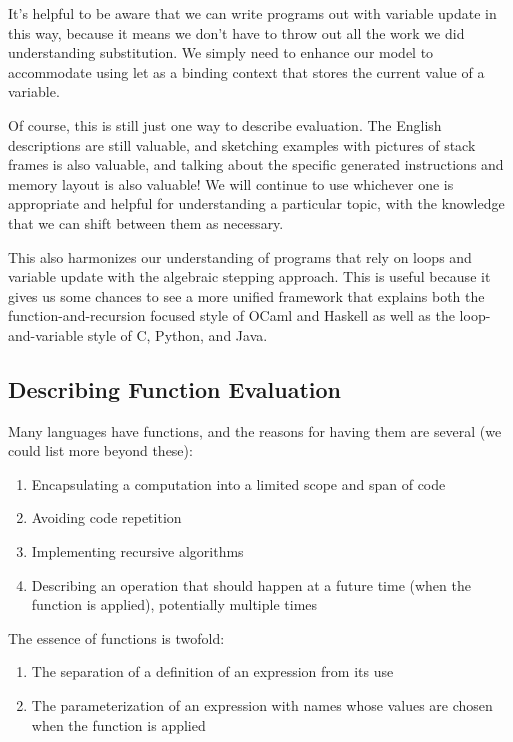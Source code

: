 \documentclass[10pt, oneside]{article}
\begin{document}
It's helpful to be aware that we can write programs out with variable update
in this way, because it means we don't have to throw out all the work we did
understanding substitution. We simply need to enhance our model to
accommodate using let as a binding context that stores the current value of a
variable.

Of course, this is still just one way to describe evaluation. The English
descriptions are still valuable, and sketching examples with pictures of
stack frames is also valuable, and talking about the specific generated
instructions and memory layout is also valuable! We will continue to use
whichever one is appropriate and helpful for understanding a particular
topic, with the knowledge that we can shift between them as necessary.

This also harmonizes our understanding of programs that rely on loops and
variable update with the algebraic stepping approach. This is useful because
it gives us some chances to see a more unified framework that explains both
the function-and-recursion focused style of OCaml and Haskell as well as the
loop-and-variable style of C, Python, and Java.

\subsection*{Describing Function Evaluation}

Many languages have functions, and the reasons for having them are several
(we could list more beyond these):

\begin{enumerate}
\item Encapsulating a computation into a limited scope and span of code
\item Avoiding code repetition
\item Implementing recursive algorithms
\item Describing an operation that should happen at a future time (when the
function is applied), potentially multiple times
\end{enumerate}

The essence of functions is twofold:

\begin{enumerate}
\item The separation of a definition of an expression from its use
\item The parameterization of an expression with names whose values are
chosen when the function is applied
\end{enumerate}
\end{document}

